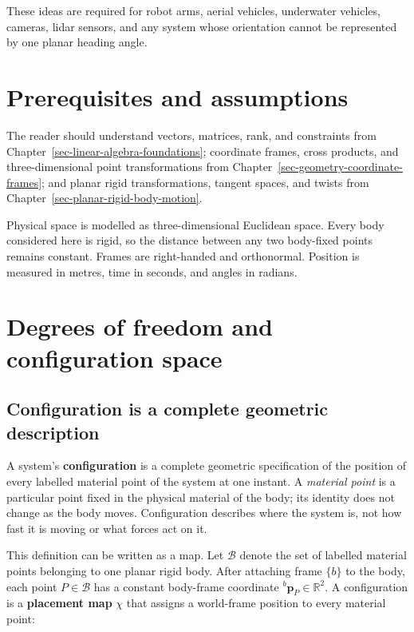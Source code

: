 \documentclass[
  australian,
  12pt,
  letterpaper,
  DIV=11,
  numbers=noendperiod,
  twoside]{scrreprt}
\begin{document}
These ideas are required for robot arms, aerial vehicles, underwater
vehicles, cameras, lidar sensors, and any system whose orientation
cannot be represented by one planar heading angle.

\section*{Prerequisites and
assumptions}\label{prerequisites-and-assumptions-4}


The reader should understand vectors, matrices, rank, and constraints
from Chapter~\ref{sec-linear-algebra-foundations}; coordinate frames,
cross products, and three-dimensional point transformations from
Chapter~\ref{sec-geometry-coordinate-frames}; and planar rigid
transformations, tangent spaces, and twists from
Chapter~\ref{sec-planar-rigid-body-motion}.

Physical space is modelled as three-dimensional Euclidean space. Every
body considered here is rigid, so the distance between any two
body-fixed points remains constant. Frames are right-handed and
orthonormal. Position is measured in metres, time in seconds, and angles
in radians.

\section{Degrees of freedom and configuration
space}\label{degrees-of-freedom-and-configuration-space}

\subsection{Configuration is a complete geometric
description}\label{configuration-is-a-complete-geometric-description}

A system's \textbf{configuration} is a complete geometric specification
of the position of every labelled material point of the system at one
instant. A \emph{material point} is a particular point fixed in the
physical material of the body; its identity does not change as the body
moves. Configuration describes where the system is, not how fast it is
moving or what forces act on it.

This definition can be written as a map. Let \(\mathcal B\) denote the
set of labelled material points belonging to one planar rigid body.
After attaching frame \(\{b\}\) to the body, each point
\(P\in\mathcal B\) has a constant body-frame coordinate
\({}^{b}\mathbf p_P\in\mathbb R^2\). A configuration is a
\textbf{placement map} \(\chi\) that assigns a world-frame position to
every material point:
\end{document}
